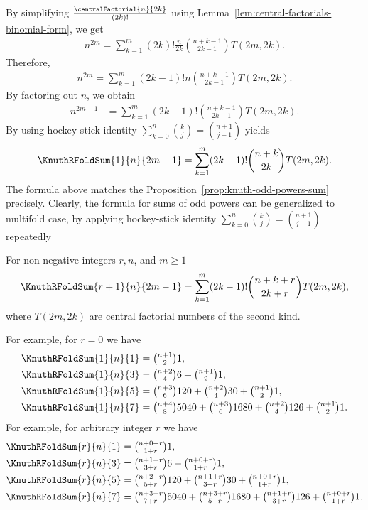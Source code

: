 By simplifying $\frac{\centralFactorial{n}{2k}}{(2k)!}$
using Lemma~\eqref{lem:central-factorials-binomial-form}, we get
\begin{align*}
  n^{2m} = \sum_{k=1}^{m} (2k)!  \frac{n}{2k} \binom{n+k-1}{2k-1} T(2m,2k).
\end{align*}
Therefore,
\begin{align*}
  n^{2m} = \sum_{k=1}^{m} (2k-1)!  n \binom{n+k-1}{2k-1} T(2m,2k).
\end{align*}
By factoring out $n$, we obtain
\begin{align*}
  n^{2m-1}
  &= \sum_{k=1}^{m} (2k-1)! \binom{n+k-1}{2k-1} T(2m,2k).
\end{align*}
By using hockey-stick identity $\sum_{k=0}^{n} \binom{k}{j} = \binom{n+1}{j+1}$
yields
\begin{align*}
  \KnuthRFoldSum{1}{n}{2m-1} = \sum_{k=1}^{m} (2k-1)! \binom{n+k}{2k} T(2m,2k).
\end{align*}
The formula above matches the Proposition~\eqref{prop:knuth-odd-powers-sum} precisely.
Clearly, the formula for sums of odd powers can be generalized to multifold case,
by applying hockey-stick identity $\sum_{k=0}^{n} \binom{k}{j} = \binom{n+1}{j+1}$
repeatedly
\begin{proposition}
  \label{prop:knuth-odd-powers-sum-multifold}
  For non-negative integers $r,n$, and $m \geq 1$
  \begin{align*}
    \KnuthRFoldSum{r+1}{n}{2m-1}
    = \sum_{k=1}^{m} (2k-1)! \binom{n+k+r}{2k+r} T(2m,2k),
  \end{align*}
  where $T(2m,2k)$ are central factorial numbers of the second kind.
\end{proposition}
For example, for $r=0$ we have
\begin{align*}
  \KnuthRFoldSum{1}{n}{1} &= \tbinom{n+1}{2} 1, \\
  \KnuthRFoldSum{1}{n}{3} &= \tbinom{n+2}{4} 6    + \tbinom{n+1}{2} 1, \\
  \KnuthRFoldSum{1}{n}{5} &= \tbinom{n+3}{6} 120  + \tbinom{n+2}{4} 30   + \tbinom{n+1}{2} 1, \\
  \KnuthRFoldSum{1}{n}{7} &= \tbinom{n+4}{8} 5040 + \tbinom{n+3}{6} 1680 + \tbinom{n+2}{4} 126 + \tbinom{n+1}{2} 1.
\end{align*}
For example, for arbitrary integer $r$ we have
\begin{align*}
  \KnuthRFoldSum{r}{n}{1} &= \tbinom{n+0+r}{1+r} 1, \\
  \KnuthRFoldSum{r}{n}{3} &= \tbinom{n+1+r}{3+r} 6    + \tbinom{n+0+r}{1+r} 1, \\
  \KnuthRFoldSum{r}{n}{5} &= \tbinom{n+2+r}{5+r} 120  + \tbinom{n+1+r}{3+r} 30   + \tbinom{n+0+r}{1+r} 1, \\
  \KnuthRFoldSum{r}{n}{7} &= \tbinom{n+3+r}{7+r} 5040 + \tbinom{n+3+r}{5+r} 1680 + \tbinom{n+1+r}{3+r} 126 + \tbinom{n+0+r}{1+r} 1.
\end{align*}
